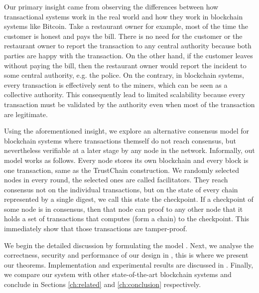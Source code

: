 Our primary insight came from observing the differences between how transactional systems work in the real world and how they work in blockchain systems like Bitcoin. 
Take a restaurant owner for example, most of the time the customer is honest and pays the bill.
There is no need for the customer or the restaurant owner to report the transaction to any central authority 
because both parties are happy with the transaction.
On the other hand, if the customer leaves without paying the bill,
then the restaurant owner would report the incident to some central authority, e.g. the police.
On the contrary, in blockchain systems, every transaction is effectively sent to the miners,
which can be seen as a collective authority.
This consequently lead to limited scalability because every transaction must be validated by the authority even when most of the transaction are legitimate.

Using the aforementioned insight,
we explore an alternative consensus model for blockchain systems where transactions themself do not reach consensus,
but nevertheless verifiable at a later stage by any node in the network.
Informally, out model works as follows.
Every node stores its own blockchain and every block is one transaction, same as the TrustChain construction.
We randomly selected nodes in every round, the selected ones are called facilitators.
They reach consensus not on the individual transactions,
but on the state of every chain represented by a single digest, we call this state the checkpoint.
If a checkpoint of some node is in consensus, 
then that node can proof to any other node that it holds a set of transactions that computes (form a chain) to the checkpoint.
This immediately show that those transactions are tamper-proof.

We begin the detailed discussion by formulating the model . 
Next, we analyse the correctness, security and performance of our design in ,
this is where we present our theorems.
Implementation and experimental results are discussed in .
Finally, we compare our system with other state-of-the-art blockchain systems and conclude in Sections \ref{ch:related} and \ref{ch:conclusion} respectively.


